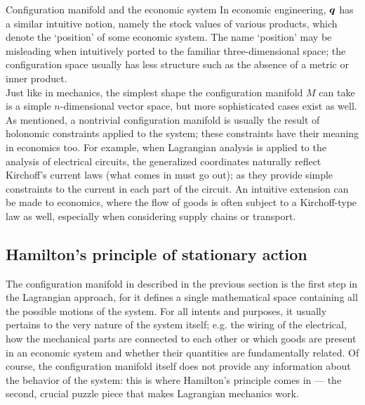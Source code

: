 \begin{econ}{Configuration manifold and the economic system}
    In economic engineering, \(\vb*{q}\) has a similar intuitive notion, namely the stock values of various products, which denote the `position' of some economic system. The name `position' may be misleading when intuitively ported to the familiar three-dimensional space; the configuration space usually has less structure such as the absence of a metric or inner product.\\

    Just like in mechanics, the simplest shape the configuration manifold $M$ can take is a simple $n$-dimensional vector space, but more sophisticated cases exist as well. As mentioned, a nontrivial configuration manifold is usually the result of holonomic constraints applied to the system; these constraints have their meaning in economics too.
    For example, when Lagrangian analysis is applied to the analysis of electrical circuits, the generalized coordinates naturally reflect Kirchoff's current laws (what comes in must go out); as they provide simple constraints to the current in each part of the circuit. An intuitive extension can be made to economics, where the flow of goods is often subject to a Kirchoff-type law as well, especially when considering supply chains or transport. 
\end{econ}

\subsection{Hamilton's principle of stationary action}
The configuration manifold in described in the previous section is the first step in the Lagrangian approach, for it defines a single mathematical space containing all the possible motions of the system. For all intents and purposes, it usually pertains to the very nature of the system itself; e.g. the wiring of the electrical, how the mechanical parts are connected to each other or which goods are present in an economic system and whether their quantities are fundamentally related. Of course, the configuration manifold itself does not provide any information about the behavior of the system: this is where Hamilton's principle comes in --- the second, crucial puzzle piece that makes Lagrangian mechanics work.

